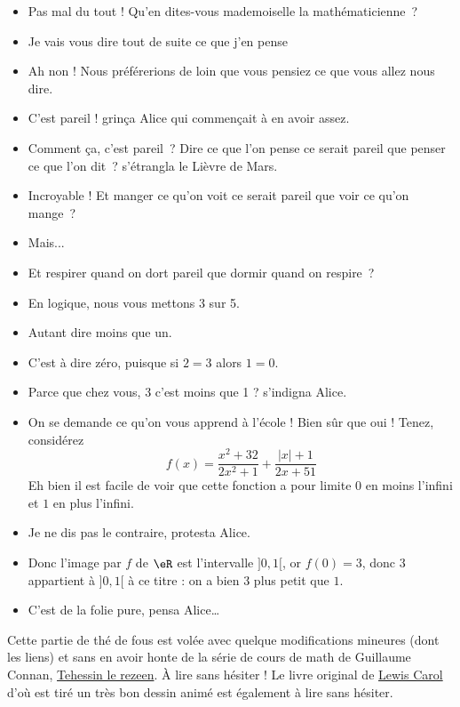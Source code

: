 \begin{itemize}
\item Pas mal du tout ! Qu'en dites-vous mademoiselle la mathématicienne~?
\item Je vais vous dire tout de suite ce que j'en pense
\item Ah non ! Nous préférerions de loin que vous pensiez ce que vous allez nous dire.
\item C'est pareil ! grinça Alice qui commençait à en avoir assez.
\item Comment ça, c'est pareil~? Dire ce que l'on pense ce serait pareil que penser ce que l'on dit~? s'étrangla le Lièvre de Mars.
\item Incroyable ! Et manger ce qu'on voit ce serait pareil que voir ce qu'on mange~?
\item Mais...
\item Et respirer quand on dort pareil que dormir quand on respire~?
\item En logique, nous vous mettons 3 sur 5.
\item Autant dire moins que un.
\item C'est à dire zéro, puisque si $2=3$ alors $1=0$.
\item Parce que chez vous, 3 c'est moins que 1 ? s'indigna Alice.
\item On se demande ce qu'on vous apprend à l'école ! Bien sûr que oui ! Tenez, considérez
		\[ 
			f(x)=\frac{x^2+32}{2x^2+1}+\frac{|x|+1}{2x+51}
		\]
Eh bien il est facile de voir que cette fonction a pour limite $0$ en moins l'infini et $1$ en plus l'infini.
\item Je ne dis pas le contraire, protesta Alice.
\item Donc l'image par $f$ de $\eR$ est l'intervalle $]0,1[$, or $f(0)=3$, donc $3$ appartient à $]0,1[$ à ce titre : on a bien $3$ plus petit que $1$.
\item C'est de la folie pure, pensa Alice\ldots
\end{itemize}


\begin{remark}
Cette partie de thé de fous est volée avec quelque modifications mineures (dont les liens) et sans en avoir honte de la série de cours de math de Guillaume Connan, \href{http://gconnan.free.fr/}{Tehessin le rezeen}. À lire sans hésiter ! Le livre original de \href{http://fr.wikipedia.org/wiki/Lewis_Carroll}{Lewis Carol} d'où est tiré un très bon dessin animé est également à lire sans hésiter.
\end{remark}




